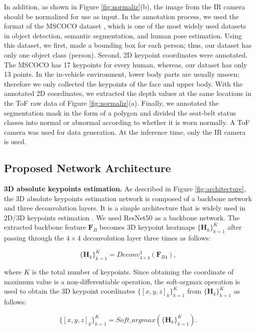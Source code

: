 \documentclass[letterpaper]{article} %
\begin{document}
In addition, as shown in Figure \ref{fig:normaliz}(b), the image from the IR camera should be normalized for use as input. In the annotation process, we used the format of the MSCOCO dataset \cite{lin2014microsoft}, which is one of the most widely used datasets in object detection, semantic segmentation, and human pose estimation. Using this dataset, we first, made a bounding box for each person; thus, our dataset has only one object class (person). Second, 2D keypoint coordinates were annotated. The MSCOCO has 17 keypoints for every human, whereas, our dataset has only 13 points. 
In the in-vehicle environment, lower body parts are usually unseen; therefore we only collected the keypoints of the face and upper body. With the annotated 2D coordinates, we extracted the depth values at the same locations in the ToF raw data of Figure \ref{fig:normaliz}(a). Finally, we annotated the segmentation mask in the form of a polygon and divided the seat-belt status classes into normal or abnormal according to whether it is worn normally. A ToF camera was used for data generation. At the inference time, only the IR camera is used.

\subsection{Proposed Network Architecture}
\textbf{3D absolute keypoints estimation.} As described in Figure \ref{fig:architecture}, the 3D absolute keypoints estimation network is composed of a backbone network and three deconvolution layers. It is a simple architecture that is widely used in 2D/3D keypoints estimation \cite{xiao2018simple, moon2019camera}. We used ResNet50 \cite{he2016identity} as a backbone network. The extracted backbone feature $\textbf{F}_{B}$ becomes 3D keypoint heatmaps $\{{\mathbf H}_{k}\}_{k=1}^{K}$ after passing through the $4\times4$ deconvolution layer three times as follows:

\begin{equation} \label{1}
{\{{\mathbf H}_{k}\}_{k=1}^{K} = Deconv_{4\times4}^{3}(\textbf{F}_{B4})},
\end{equation}

\noindent where $K$ is the total number of keypoints. Since obtaining the coordinate of maximum value is a non-differentiable operation, the soft-argmax operation is used to obtain the 3D keypoint coordinates $\{[{x}, {y}, {z}]_{k}\}_{k=1}^{K}$ from $\{{\mathbf H}_{k}\}_{k=1}^{K}$ as follows:

\begin{equation} \label{2}
{\{[{x}, {y}, {z}]_{k}\}_{k=1}^{K} = Soft\_argmax(\{{\mathbf H}_{k}\}_{k=1}^{K})}.
\end{equation}
\end{document}
